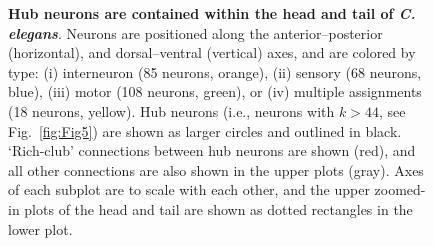 \documentclass[10pt,letterpaper]{article}
\begin{document}

\begin{figure}[h]
\centering
\caption{
\textbf{Hub neurons are contained within the head and tail of \emph{C. elegans}}.
Neurons are positioned along the anterior--posterior (horizontal), and dorsal--ventral (vertical) axes, and are colored by type:
(i) interneuron (85 neurons, orange),
(ii) sensory (68 neurons, blue),
(iii) motor (108 neurons, green), or
(iv) multiple assignments (18 neurons, yellow).
Hub neurons (i.e., neurons with $k > 44$, see Fig.~\ref{fig:Fig5}) are shown as larger circles and outlined in black.
`Rich-club' connections between hub neurons are shown (red), and all other connections are also shown in the upper plots (gray).
Axes of each subplot are to scale with each other, and the upper zoomed-in plots of the head and tail are shown as dotted rectangles in the lower plot.
\label{fig:Fig2}
}
\end{figure}
\end{document}
